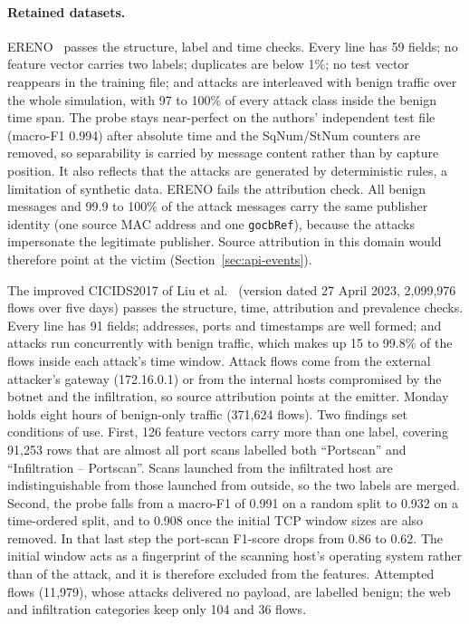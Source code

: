 \paragraph{Retained datasets.}
ERENO~\cite{quincozes2023ereno} passes the structure, label and time checks. Every line
has 59 fields; no feature vector carries two labels; duplicates are below 1\%; no test
vector reappears in the training file; and attacks are interleaved with benign traffic
over the whole simulation, with 97 to 100\% of every attack class inside the benign time
span. The probe stays near-perfect on the authors' independent test file (macro-F1 0.994)
after absolute time and the SqNum/StNum counters are removed, so separability is carried
by message content rather than by capture position. It also reflects that the attacks
are generated by deterministic rules, a limitation of synthetic data. ERENO fails the
attribution check. All benign messages and 99.9 to 100\% of the attack messages carry
the same publisher identity (one source MAC address and one \texttt{gocbRef}), because
the attacks impersonate the legitimate publisher. Source attribution in this domain would
therefore point at the victim (Section~\ref{sec:api-events}).

The improved CICIDS2017 of Liu et al.~\cite{liu2022error} (version dated 27 April 2023,
2{,}099{,}976 flows over five days) passes the structure, time, attribution and prevalence checks.
Every line has 91 fields; addresses, ports and timestamps are well formed; and attacks
run concurrently with benign traffic, which makes up 15 to 99.8\% of the flows inside
each attack's time window. Attack flows come from the external attacker's gateway
(172.16.0.1) or from the internal hosts compromised by the botnet and the infiltration,
so source attribution points at the emitter. Monday holds eight hours of benign-only
traffic (371{,}624 flows). Two findings set conditions of use. First, 126 feature
vectors carry more than one label, covering 91{,}253 rows that are almost all port scans
labelled both ``Portscan'' and ``Infiltration -- Portscan''. Scans launched from the
infiltrated host are indistinguishable from those launched from outside, so the two
labels are merged. Second, the probe falls from a macro-F1 of 0.991 on a random split to
0.932 on a time-ordered split, and to 0.908 once the initial TCP window sizes are also
removed. In that last step the port-scan F1-score drops from 0.86 to 0.62. The initial
window acts as a fingerprint of the scanning host's operating system rather than of the
attack, and it is therefore excluded from the features.
Attempted flows (11{,}979), whose attacks delivered no payload, are labelled benign; the
web and infiltration categories keep only 104 and 36 flows.

